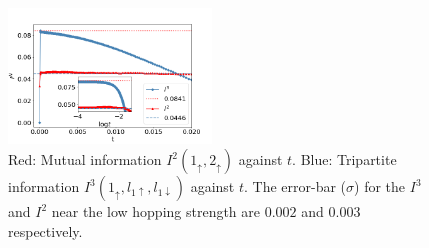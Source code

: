 \documentclass[reprint,prb,superscriptaddress]{revtex4-2}
\begin{document}
\begin{figure}[!htpb]
\centering
\includegraphics[width=0.48\textwidth]{I3I2AI.png}
\caption{Red: Mutual information $I^2(1_{\uparrow},2_{\uparrow})$ against \(t\). Blue: Tripartite information $I^3(1_{\uparrow},l_{1\uparrow},l_{1\downarrow})$ against \(t\). The error-bar ($\sigma$) for the $I^3$ and $I^2$ near the low hopping strength are $0.002$ and $0.003$ respectively.}
\label{fig:I3_I2_two_channel}
\end{figure}
\end{document}
